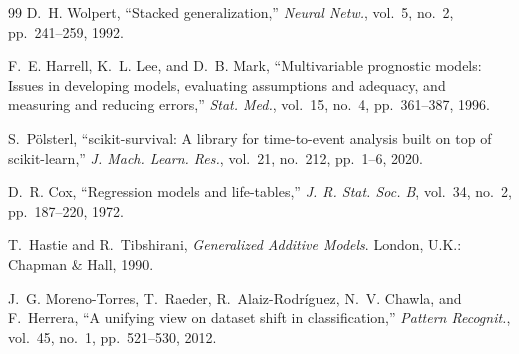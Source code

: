 \documentclass[journal]{IEEEtran}
\begin{document}
\begin{thebibliography}{99}
 D.~H. Wolpert, ``Stacked generalization,'' \emph{Neural
Netw.}, vol.~5, no.~2, pp.~241--259, 1992.

 F.~E. Harrell, K.~L. Lee, and D.~B. Mark, ``Multivariable
prognostic models: Issues in developing models, evaluating assumptions and
adequacy, and measuring and reducing errors,'' \emph{Stat. Med.}, vol.~15,
no.~4, pp.~361--387, 1996.

 S.~P\"olsterl, ``scikit-survival: A library for
time-to-event analysis built on top of scikit-learn,'' \emph{J. Mach. Learn.
Res.}, vol.~21, no.~212, pp.~1--6, 2020.

 D.~R. Cox, ``Regression models and life-tables,'' \emph{J. R.
Stat. Soc. B}, vol.~34, no.~2, pp.~187--220, 1972.

 T.~Hastie and R.~Tibshirani, \emph{Generalized Additive
Models}. London, U.K.: Chapman \& Hall, 1990.

 J.~G. Moreno-Torres, T.~Raeder, R.~Alaiz-Rodr\'iguez,
N.~V. Chawla, and F.~Herrera, ``A unifying view on dataset shift in
classification,'' \emph{Pattern Recognit.}, vol.~45, no.~1, pp.~521--530, 2012.
\end{thebibliography}
\end{document}
